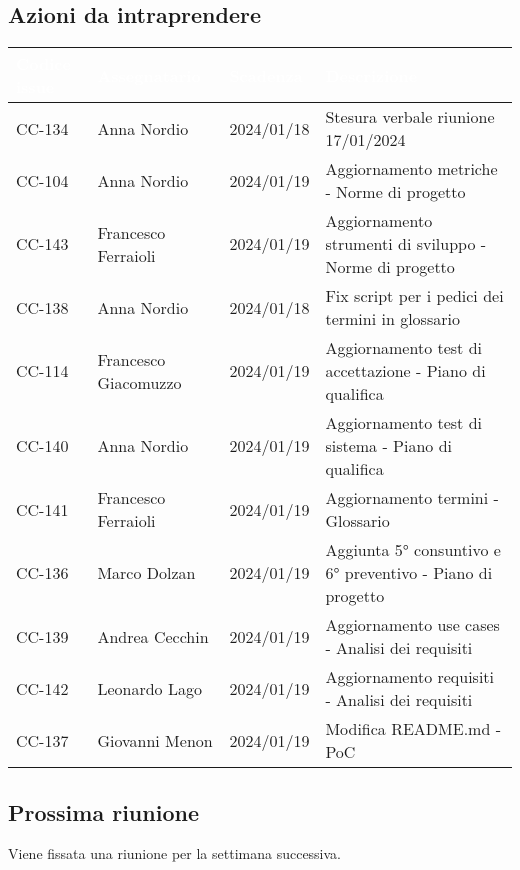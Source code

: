 \subsection{Azioni da intraprendere}
{
    \setlength{\tabcolsep}{10pt}
            \renewcommand{\arraystretch}{1.5}
            \begin{xltabular}{\textwidth}{| l | l | l | X |}
                 \hline
                 \textbf{\textcolor{white}{Codice issue}} & \textbf{\textcolor{white}{Assegnatario}} & \textbf{\textcolor{white}{Scadenza}} & \textbf{\textcolor{white}{Descrizione}} \\
                 \hline
                 CC-134 & Anna Nordio & 2024/01/18 & Stesura verbale riunione 17/01/2024 \\
                 \hline
                 CC-104 & Anna Nordio & 2024/01/19 & Aggiornamento metriche - Norme di progetto\\
                 \hline
                 CC-143 & Francesco Ferraioli & 2024/01/19 & Aggiornamento strumenti di sviluppo - Norme di progetto\\
                 \hline
                 CC-138 & Anna Nordio & 2024/01/18 & Fix script per i pedici dei termini in glossario \\
                 \hline
                 CC-114 & Francesco Giacomuzzo & 2024/01/19 & Aggiornamento test di accettazione - Piano di qualifica \\
                 \hline
                 CC-140 & Anna Nordio & 2024/01/19 & Aggiornamento test di sistema - Piano di qualifica \\
                 \hline
                 CC-141 & Francesco Ferraioli & 2024/01/19 & Aggiornamento termini - Glossario \\
                 \hline
                 CC-136 & Marco Dolzan & 2024/01/19 & Aggiunta 5° consuntivo e 6° preventivo - Piano di progetto \\
                 \hline
                 CC-139 & Andrea Cecchin & 2024/01/19 & Aggiornamento use cases - Analisi dei requisiti \\
                 \hline
                 CC-142 & Leonardo Lago & 2024/01/19 & Aggiornamento requisiti - Analisi dei requisiti \\
                 \hline
                 CC-137 & Giovanni Menon & 2024/01/19 & Modifica README.md - PoC \\
                 \hline
            \end{xltabular}
}


\subsection{Prossima riunione} \label{subsec:riunione}
Viene fissata una riunione per la settimana successiva.
